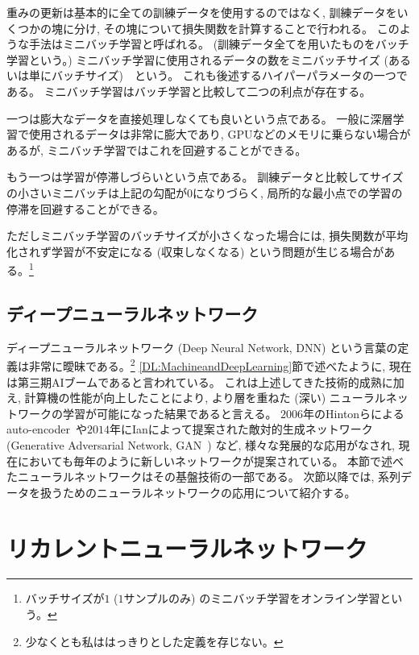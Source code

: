 重みの更新は基本的に全ての訓練データを使用するのではなく, 訓練データをいくつかの塊に分け, その塊について損失関数を計算することで行われる。
このような手法はミニバッチ学習と呼ばれる。
(訓練データ全てを用いたものをバッチ学習という。)
ミニバッチ学習に使用されるデータの数をミニバッチサイズ (あるいは単にバッチサイズ)　という。
これも後述するハイパーパラメータの一つである。
ミニバッチ学習はバッチ学習と比較して二つの利点が存在する。

一つは膨大なデータを直接処理しなくても良いという点である。
一般に深層学習で使用されるデータは非常に膨大であり, GPUなどのメモリに乗らない場合があるが, ミニバッチ学習ではこれを回避することができる。

もう一つは学習が停滞しづらいという点である。
訓練データと比較してサイズの小さいミニバッチは上記の勾配が0になりづらく, 局所的な最小点での学習の停滞を回避することができる。

ただしミニバッチ学習のバッチサイズが小さくなった場合には, 損失関数が平均化されず学習が不安定になる (収束しなくなる) という問題が生じる場合がある。\footnote{バッチサイズが$1$ ($1$サンプルのみ) のミニバッチ学習をオンライン学習という。}


\subsection{ディープニューラルネットワーク} \label{DL:NN:DeepNeuralNetwork}

ディープニューラルネットワーク (Deep Neural Network, DNN) という言葉の定義は非常に曖昧である。\footnote{少なくとも私ははっきりとした定義を存じない。}
\ref{DL:MachineandDeepLearning}節で述べたように, 現在は第三期AIブームであると言われている。
これは上述してきた技術的成熟に加え, 計算機の性能が向上したことにより, より層を重ねた (深い) ニューラルネットワークの学習が可能になった結果であると言える。
$2006$年のHintonらによるauto-encoder~\cite{Autoencoder}や$2014$年にIanによって提案された敵対的生成ネットワーク (Generative Adversarial Network, GAN~\cite{GenerativeAdversarialNetworks}) など, 様々な発展的な応用がなされ, 現在においても毎年のように新しいネットワークが提案されている。
本節で述べたニューラルネットワークはその基盤技術の一部である。
次節以降では, 系列データを扱うためのニューラルネットワークの応用について紹介する。


\section{リカレントニューラルネットワーク} \label{DL:RecurrentNeuralNetwork}


